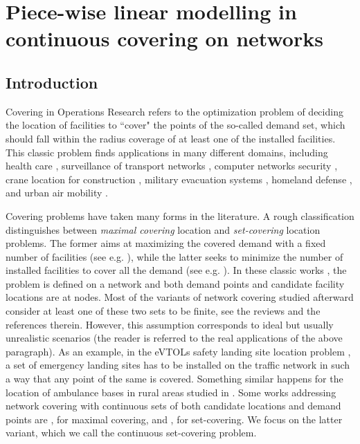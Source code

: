 \chapter{Piece-wise linear modelling in continuous covering on networks}
\label{chap.cflg}

\section{Introduction}
Covering in Operations Research refers to the optimization problem of deciding the location of facilities to ``cover" the points of the so-called demand set, which should fall within the radius coverage of at least one of the installed facilities.
This classic problem finds applications in many different domains, including health care \cite{health}, surveillance of transport networks \cite{Gusev20}, computer networks security \cite{worm}, crane location for construction \cite{crane}, military evacuation systems \cite{military}, homeland defense \cite{homeland}, and urban air mobility \cite{liding}.

Covering problems have taken many forms in the literature. A rough classification distinguishes between \emph{maximal covering} location and \emph{set-covering} location problems. The former aims at maximizing the covered demand with a fixed number of facilities (see e.g. \cite{Church74}), while the latter seeks to minimize the number of installed facilities to cover all the demand (see e.g. \cite{Toregas72}). In these classic works \cite{Church74,Toregas72}, the problem is defined on a network and both demand points and candidate facility locations are at nodes. Most of the variants of network covering studied afterward consider at least one of these two sets to be finite, see the reviews \cite{chapter-plastria,chapter-marin} and the references therein. However, this assumption corresponds to ideal but usually unrealistic scenarios (the reader is referred to the real applications of the above paragraph). As an example, in the eVTOLs safety landing site location problem \cite{liding}, a set of emergency landing sites has to be installed on the traffic network in such a way that any point of the same is covered. Something similar happens for the location of ambulance bases in rural areas studied in \cite{health}.
Some works addressing network covering with continuous sets of both candidate locations and demand points are \cite{Carrizosa16,Kalsics,Baldomero}, for maximal covering, and \cite{Gurevich84,Hamacher20,Hartmann21}, for set-covering. We focus on the latter variant, which we call the continuous set-covering problem.

